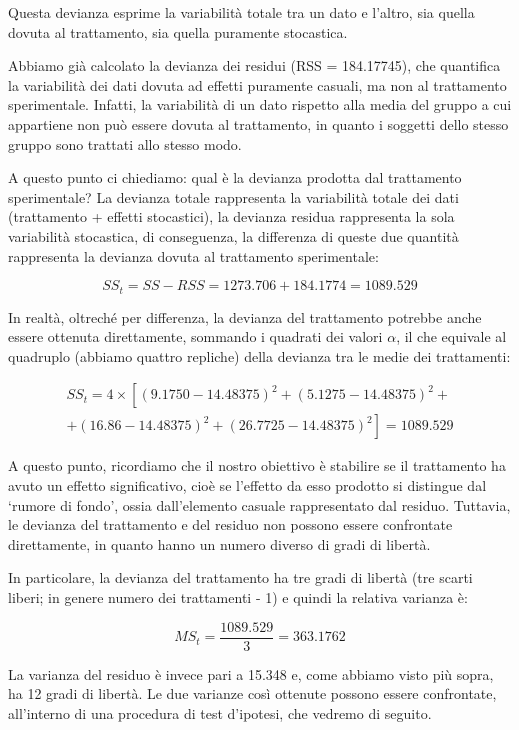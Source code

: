 \documentclass[a4paper,12pt,oneside]{book}
\begin{document}
Questa devianza esprime la variabilità totale tra un dato e l'altro, sia quella dovuta al trattamento, sia quella puramente stocastica.

Abbiamo già calcolato la devianza dei residui (RSS = 184.17745), che quantifica la variabilità dei dati dovuta ad effetti puramente casuali, ma non al trattamento sperimentale. Infatti, la variabilità di un dato rispetto alla media del gruppo a cui appartiene non può essere dovuta al trattamento, in quanto i soggetti dello stesso gruppo sono trattati allo stesso modo.

A questo punto ci chiediamo: qual è la devianza prodotta dal trattamento sperimentale? La devianza totale rappresenta la variabilità totale dei dati (trattamento + effetti stocastici), la devianza residua rappresenta la sola variabilità stocastica, di conseguenza, la differenza di queste due quantità rappresenta la devianza dovuta al trattamento sperimentale:

\[SS_t = SS - RSS = 1273.706 + 184.1774 = 1089.529\]

In realtà, oltreché per differenza, la devianza del trattamento potrebbe anche essere ottenuta direttamente, sommando i quadrati dei valori \(\alpha\), il che equivale al quadruplo (abbiamo quattro repliche) della devianza tra le medie dei trattamenti:

\[{\begin{array}{l}
SS_t = 4 \times \left[ \left(9.1750 - 14.48375\right)^2 
+ \left(5.1275 - 14.48375\right)^2 + \right. \\
+ \left. \left(16.86 - 14.48375\right)^2 + \left(26.7725 - 14.48375\right)^2 \right] = 1089.529
\end{array}}\]

A questo punto, ricordiamo che il nostro obiettivo è stabilire se il trattamento ha avuto un effetto significativo, cioè se l'effetto da esso prodotto si distingue dal `rumore di fondo', ossia dall'elemento casuale rappresentato dal residuo. Tuttavia, le devianza del trattamento e del residuo non possono essere confrontate direttamente, in quanto hanno un numero diverso di gradi di libertà.

In particolare, la devianza del trattamento ha tre gradi di libertà (tre scarti liberi; in genere numero dei trattamenti - 1) e quindi la relativa varianza è:

\[MS_t = \frac{1089.529}{3} = 363.1762\]

La varianza del residuo è invece pari a 15.348 e, come abbiamo visto più sopra, ha 12 gradi di libertà. Le due varianze così ottenute possono essere confrontate, all'interno di una procedura di test d'ipotesi, che vedremo di seguito.
\end{document}
